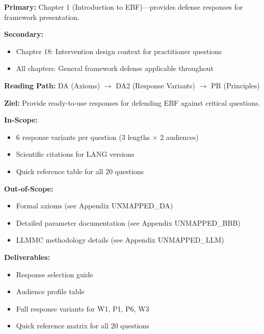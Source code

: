 
\begin{tcolorbox}[colback=blue!5!white, colframe=blue!75!black,
    title=Chapter Linkage]
\textbf{Primary:} Chapter 1 (Introduction to EBF)---provides defense responses for framework presentation.

\textbf{Secondary:}
\begin{itemize}[nosep]
    \item Chapter 18: Intervention design context for practitioner questions
    \item All chapters: General framework defense applicable throughout
\end{itemize}

\textbf{Reading Path:} DA (Axioms) $\rightarrow$ DA2 (Response Variants) $\rightarrow$ PR (Principles)
\end{tcolorbox}


\begin{tcolorbox}[colback=green!5!white, colframe=green!75!black,
    title=Appendix Scope: Response Variants]
\textbf{Ziel:} Provide ready-to-use responses for defending EBF against critical questions.

\textbf{In-Scope:}
\begin{itemize}[nosep]
    \item 6 response variants per question (3 lengths $\times$ 2 audiences)
    \item Scientific citations for LANG versions
    \item Quick reference table for all 20 questions
\end{itemize}

\textbf{Out-of-Scope:}
\begin{itemize}[nosep]
    \item Formal axioms (see Appendix UNMAPPED_DA)
    \item Detailed parameter documentation (see Appendix UNMAPPED_BBB)
    \item LLMMC methodology details (see Appendix UNMAPPED_LLM)
\end{itemize}

\textbf{Deliverables:}
\begin{itemize}[nosep]
    \item Response selection guide
    \item Audience profile table
    \item Full response variants for W1, P1, P6, W3
    \item Quick reference matrix for all 20 questions
\end{itemize}
\end{tcolorbox}

